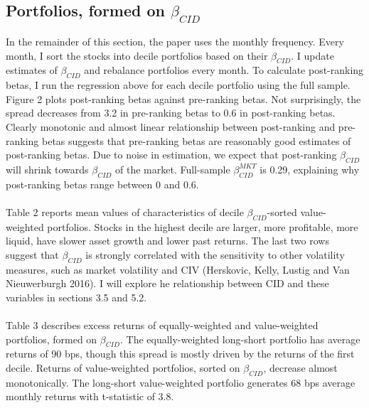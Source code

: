 \documentclass[12pt]{article}
\begin{document}
\subsection{Portfolios, formed on $\beta_{CID}$}

In the remainder of this section, the paper uses the monthly frequency. Every month, I sort the stocks into decile portfolios based on their $\beta_{CID}$. I update estimates of $\beta_{CID}$ and rebalance portfolios every month. To calculate post-ranking betas, I run the  regression above for each decile portfolio using the full sample. Figure 2 plots post-ranking betas against pre-ranking betas. Not surprisingly, the spread decreases from 3.2 in pre-ranking betas to 0.6 in post-ranking betas. Clearly monotonic and almost linear relationship between post-ranking and pre-ranking betas suggests that pre-ranking betas are reasonably good estimates of post-ranking betas. Due to noise in estimation, we expect that post-ranking $\beta_{CID}$ will shrink towards $\beta_{CID}$ of the market. Full-sample $\beta^{MKT}_{CID}$ is 0.29, explaining why post-ranking betas range between 0 and 0.6.
\paragraph{}
Table 2 reports mean values of characteristics of decile $\beta_{CID}$-sorted value-weighted portfolios. Stocks in the highest decile are larger, more profitable, more liquid, have slower asset growth and lower past returns. The last two rows suggest that $\beta_{CID}$ is strongly correlated with the sensitivity to other volatility measures, such as market volatility and CIV (Herskovic, Kelly, Lustig and Van Nieuwerburgh 2016). I will explore he relationship between CID and these variables in sections 3.5 and 5.2.
\paragraph{}
Table 3 describes excess returns of equally-weighted and value-weighted portfolios, formed on $\beta_{CID}$. The equally-weighted long-short portfolio has average returns of 90 bps, though this spread is mostly driven by the returns of the first decile. Returns of value-weighted portfolios, sorted on $\beta_{CID}$, decrease almost monotonically. The long-short value-weighted portfolio generates 68 bps average monthly returns with t-statistic of 3.8. 
\end{document}
